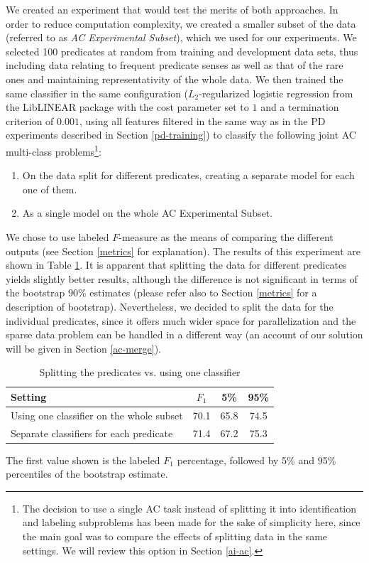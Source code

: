 \documentclass[12pt,notitlepage]{report}
\begin{document}
We created an experiment that would test the merits of both approaches. In order to reduce computation complexity, we created a smaller subset of the data (referred to as \emph{AC Experimental Subset}), which we used for our experiments. We selected 100 predicates at random from training and development data sets, thus including data relating to frequent predicate senses as well as that of the rare ones and maintaining representativity of the whole data. We then trained the same classifier in the same configuration ($L_2$-regularized logistic regression from the LibLINEAR package with the cost parameter set to $1$ and a termination criterion of $0.001$, using all features filtered in the same way as in the PD experiments described in Section \ref{pd-training}) to classify the following joint AC multi-class problems\footnote{The decision to use a single AC task instead of splitting it into identification and labeling subproblems has been made for the sake of simplicity here, since the main goal was to compare the effects of splitting data in the same settings. We will review this option in Section \ref{ai-ac}.}:
\begin{enumerate}
    \item On the data split for different predicates, creating a separate model for each one of them.
    \item As a single model on the whole AC Experimental Subset.
\end{enumerate}
We chose to use labeled $F$-measure as the means of comparing the different outputs (see Section \ref{metrics} for explanation). The results of this experiment are shown in Table \ref{tab:one-bag}. It is apparent that splitting the data for different predicates yields slightly better results, although the difference is not significant in terms of the bootstrap 90\% estimates (please refer also to Section \ref{metrics} for a description of bootstrap). Nevertheless, we decided to split the data for the individual predicates, since it offers much wider space for parallelization and the sparse data problem can be handled in a different way (an account of our solution will be given in Section \ref{ac-merge}).

\begin{table}[htb]\label{tab:one-bag}
\caption{Splitting the predicates vs. using one classifier}\footnotesize
\begin{center}
\begin{tabular}{|l|c|c|c|}\hline
\bf Setting & $F_1$ & \bf 5\% & \bf 95\% \\\hline
Using one classifier on the whole subset & 70.1 & 65.8 & 74.5 \\
Separate classifiers for each predicate &  71.4 & 67.2 & 75.3 \\\hline
\end{tabular}
\end{center}
The first value shown is the labeled $F_1$ percentage, followed by 5\% and 95\% percentiles of the bootstrap estimate.
\end{table}
\end{document}
